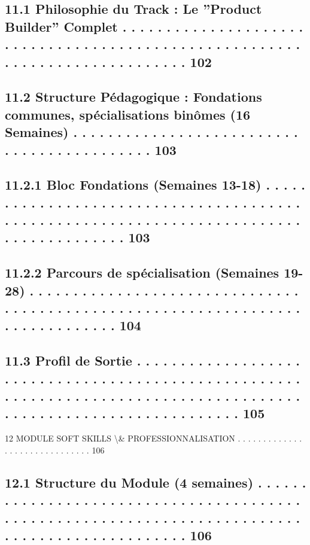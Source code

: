 \documentclass[12pt,landscape,a4paper]{article}
\begin{document}
\subsection{11.1    Philosophie du Track : Le ”Product Builder” Complet . . . . . . . . . . . . . . . . . . . . . . . . . . . . . . . . . . . . . . . . . . . . . . . . . . . . . . . . . . . . . . . . . . . . . . . . . . . . 102}
\subsection{11.2    Structure Pédagogique : Fondations communes, spécialisations binômes (16 Semaines) . . . . . . . . . . . . . . . . . . . . . . . . . . . . . . . . . . . . . . . . . . . 103}
\subsection{11.2.1              Bloc Fondations (Semaines 13-18) . . . . . . . . . . . . . . . . . . . . . . . . . . . . . . . . . . . . . . . . . . . . . . . . . . . . . . . . . . . . . . . . . . . . . . . . . . . . . . . . . . . . . . . 103}
\subsection{11.2.2              Parcours de spécialisation (Semaines 19-28) . . . . . . . . . . . . . . . . . . . . . . . . . . . . . . . . . . . . . . . . . . . . . . . . . . . . . . . . . . . . . . . . . . . . . . . . . . . . . . 104}
\subsection{11.3    Profil de Sortie . . . . . . . . . . . . . . . . . . . . . . . . . . . . . . . . . . . . . . . . . . . . . . . . . . . . . . . . . . . . . . . . . . . . . . . . . . . . . . . . . . . . . . . . . . . . . . . . . . . . . . . . . . . . . . . . . . 105}
\vspace{0.5em}
12    MODULE SOFT SKILLS \textbackslash{}& PROFESSIONNALISATION . . . . . . . . . . . . . . . . . . . . . . . . . . . . . . 106\\
\subsection{12.1    Structure du Module (4 semaines) . . . . . . . . . . . . . . . . . . . . . . . . . . . . . . . . . . . . . . . . . . . . . . . . . . . . . . . . . . . . . . . . . . . . . . . . . . . . . . . . . . . . . . . . . . . . . . . 106}
\end{document}
